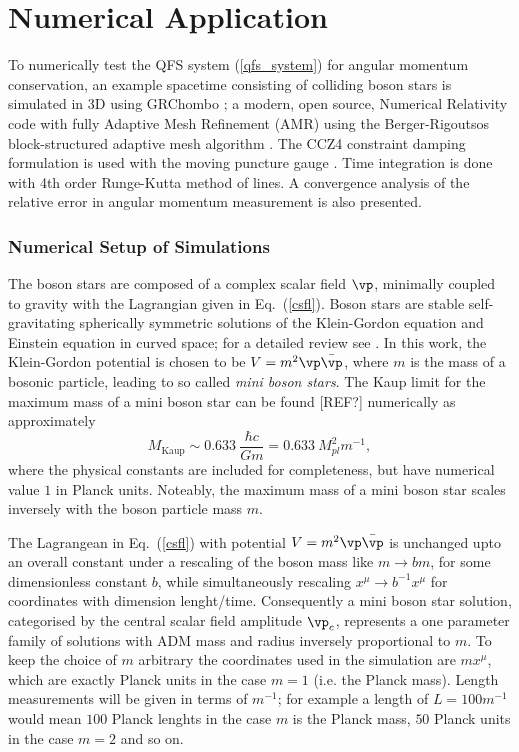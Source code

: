 \section{Numerical Application} \label{sect:results}
To numerically test the QFS system (\ref{qfs_system}) for angular momentum conservation, an example spacetime consisting of colliding boson stars is simulated in 3D using GRChombo \cite{clough2015grchombo,Andrade2021}; a modern, open source, Numerical Relativity code with fully Adaptive Mesh Refinement (AMR) using the Berger-Rigoutsos block-structured adaptive
mesh algorithm \cite{PhysRevD.67.104005}. The CCZ4 constraint damping formulation \cite{PhysRevD.67.104005,PhysRevD.85.064040} is used with the moving puncture gauge \cite{PhysRevLett.96.111101,PhysRevLett.96.111102}. Time integration is done with 4th order Runge-Kutta method of lines. A convergence analysis of the relative error in angular momentum measurement is also presented.




\subsubsection{Numerical Setup of Simulations}

The boson stars are composed of a complex scalar field $\vp$, minimally coupled to gravity with the Lagrangian given in Eq.~(\ref{csfl}). Boson stars are stable self-gravitating spherically symmetric solutions of the Klein-Gordon equation and Einstein equation in curved space; for a detailed review see \cite{liebling2017dynamical}. In this work, the Klein-Gordon potential is chosen to be $V=m^2 \vp \bar{\vp}$, where $m$ is the mass of a bosonic particle, leading to so called {\it mini boson stars}. The Kaup limit for the maximum mass of a mini boson star can be found [REF?] numerically as approximately 
\begin{equation} M_{\mathrm{Kaup}} \sim 0.633 ~\frac{\hbar c}{G m} = 0.633 ~M_{pl}^2 m^{-1}, \end{equation}
where the physical constants are included for completeness, but have numerical value $1$ in Planck units. Noteably, the maximum mass of a mini boson star scales inversely with the boson particle mass $m$. 

The Lagrangean in Eq.~(\ref{csfl}) with potential $V=m^2 \vp \bar{\vp}$ is unchanged upto an overall constant under a rescaling of the boson mass like $m \rightarrow b m$, for some dimensionless constant $b$, while simultaneously rescaling $x^\mu \rightarrow b^{-1} x^\mu$ for coordinates with dimension lenght/time. Consequently a mini boson star solution, categorised by the central scalar field amplitude $\vp_c$, represents a one parameter family of solutions with ADM mass and radius inversely proportional to $m$. To keep the choice of $m$ arbitrary the coordinates used in the simulation are $m x^\mu$, which are exactly Planck units in the case $m=1$ (i.e. the Planck mass). Length measurements will be given in terms of $m^{-1}$; for example a length of $L=100 m^{-1}$ would mean $100$ Planck lenghts in the case $m$ is the Planck mass, $50$ Planck units in the case $m=2$ and so on.


